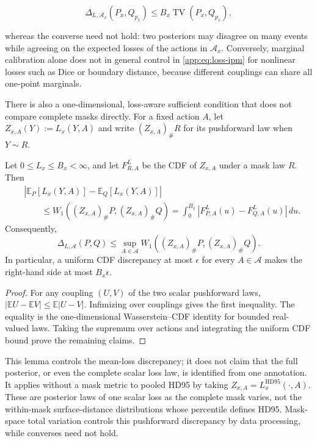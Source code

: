 \begin{equation*}
  \Delta_{L,\mathcal{A}_x}(P_x,Q_{p_x})
  \leq B_x\operatorname{TV}(P_x,Q_{p_x}),
\end{equation*}

whereas the converse need not hold: two posteriors may disagree on many
events while agreeing on the expected losses of the actions in
$\mathcal{A}_x$.  Conversely, marginal calibration alone does not in
general control in \cref{app:eq:loss-ipm} for nonlinear losses such as
Dice or boundary distance, because different couplings can share all
one-point marginals.

There is also a one-dimensional, loss-aware sufficient condition that does
not compare complete masks directly. For a fixed action $A$, let
$Z_{x,A}(Y):=L_x(Y,A)$ and write $(Z_{x,A})_\#R$ for its pushforward law when
$Y\sim R$.

\begin{lemma}
\label{app:lem:loss-pushforward}
Let $0\leq L_x\leq B_x<\infty$, and let $F^L_{R,A}$ be the CDF of
$Z_{x,A}$ under a mask law $R$. Then
\begin{align*}
  &\left|
    \mathbb E_{P}[L_x(Y,A)]-\mathbb E_{Q}[L_x(Y,A)]
  \right|\\
  &\qquad\leq
  W_1\!\left((Z_{x,A})_\#P,(Z_{x,A})_\#Q\right)
  =\int_0^{B_x}
    \left|F^L_{P,A}(u)-F^L_{Q,A}(u)\right|\,du.
\end{align*}
Consequently,
\begin{equation*}
  \Delta_{L,\mathcal A}(P,Q)
  \leq\sup_{A\in\mathcal A}
  W_1\!\left((Z_{x,A})_\#P,(Z_{x,A})_\#Q\right).
\end{equation*}
In particular, a uniform CDF discrepancy at most $\epsilon$ for every
$A\in\mathcal A$ makes the right-hand side at most $B_x\epsilon$.
\end{lemma}

\begin{proof}
For any coupling $(U,V)$ of the two scalar pushforward laws,
$|\mathbb E U-\mathbb E V|\leq\mathbb E|U-V|$. Infimizing over couplings
gives the first inequality. The equality is the one-dimensional
Wasserstein--CDF identity for bounded real-valued laws. Taking the supremum
over actions and integrating the uniform CDF bound prove the remaining
claims.
\end{proof}

This lemma controls the mean-loss discrepancy; it does not claim that the
full posterior, or even the complete scalar loss law, is identified from one
annotation. It applies without a mask metric to pooled HD95 by taking
$Z_{x,A}=L_x^{\mathrm{HD95}}(\cdot,A)$. These are posterior laws of one scalar
loss as the complete mask varies, not the within-mask surface-distance
distributions whose percentile defines HD95. Mask-space total variation
controls this pushforward discrepancy by data processing, while converses
need not hold.

